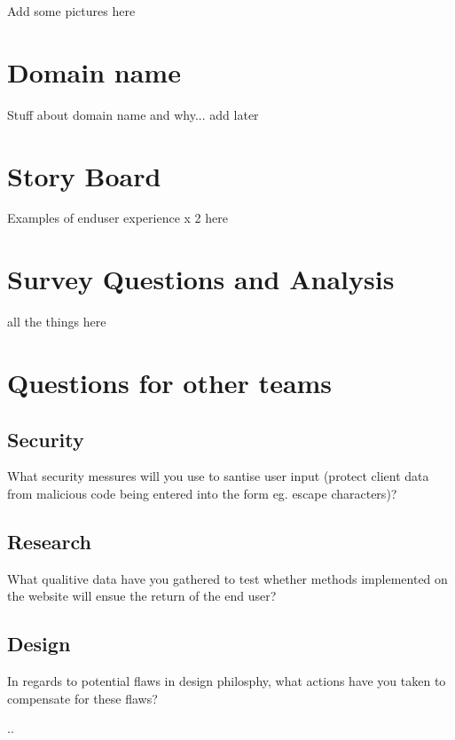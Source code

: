 \documentclass[letterpaper,12pt]{article}
\begin{document}
Add some pictures here

\section{Domain name}

Stuff about domain name and why... add later

\section{Story Board}

Examples of enduser experience x 2 here

\section{Survey Questions and Analysis}

all the things here

\section{Questions for other teams}

\subsection{ Security}

What security messures will you use to santise user input (protect client data from malicious code being entered into the form eg. escape characters)?

\subsection{Research}

What qualitive data have you gathered to test whether methods implemented on the website will ensue the return of the end user?

\subsection {Design}

In regards to potential flaws in design philosphy, what actions have you taken to compensate for these flaws?



..

\appendix
\printindex
\printglossaries

\end{document}
